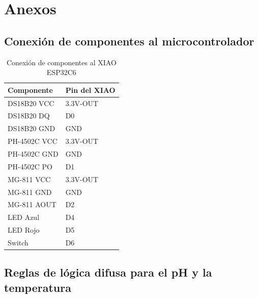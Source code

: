 \section{Anexos}

\subsection{Conexión de componentes al microcontrolador}
\begin{table}[H]
\centering
\caption{Conexión de componentes al XIAO ESP32C6}
\label{tab:conexion_xiao}
\begin{tabularx}{0.7\textwidth}{|X|X|}
\hline
\textbf{Componente} & \textbf{Pin del XIAO} \\
\hline
DS18B20 VCC  & 3.3V-OUT \\
\hline
DS18B20 DQ   & D0 \\
\hline
DS18B20 GND  & GND \\
\hline
PH-4502C VCC & 3.3V-OUT \\
\hline
PH-4502C GND & GND \\
\hline
PH-4502C PO  & D1 \\
\hline
MG-811 VCC   & 3.3V-OUT \\
\hline
MG-811 GND   & GND \\
\hline
MG-811 AOUT  & D2 \\
\hline
LED Azul     & D4 \\
\hline
LED Rojo     & D5 \\
\hline
Switch       & D6 \\
\hline
\end{tabularx}
\end{table}

\subsection{Reglas de lógica difusa para el pH y la temperatura}

